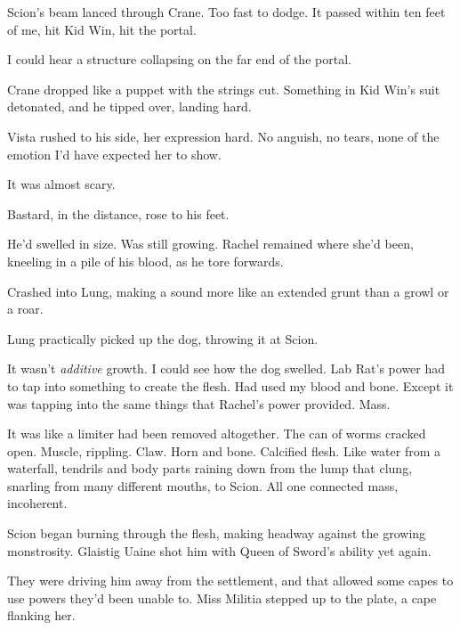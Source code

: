 Scion's beam lanced through Crane.  Too fast to dodge.  It passed within ten feet of me, hit Kid Win, hit the portal.



I could hear a structure collapsing on the far end of the portal.



Crane dropped like a puppet with the strings cut.  Something in Kid Win's suit detonated, and he tipped over, landing hard.



Vista rushed to his side, her expression hard.  No anguish, no tears, none of the emotion I'd have expected her to show.



It was almost scary.



Bastard, in the distance, rose to his feet.



He'd swelled in size.  Was still growing.  Rachel remained where she'd been, kneeling in a pile of his blood, as he tore forwards.



Crashed into Lung, making a sound more like an extended grunt than a growl or a roar.



Lung practically picked up the dog, throwing it at Scion.



It wasn't \emph{additive} growth.  I could see how the dog swelled.  Lab Rat's power had to tap into something to create the flesh.  Had used my blood and bone.  Except it was tapping into the same things that Rachel's power provided.  Mass.



It was like a limiter had been removed altogether.  The can of worms cracked open.  Muscle, rippling.  Claw.  Horn and bone.  Calcified flesh.  Like water from a waterfall, tendrils and body parts raining down from the lump that clung, snarling from many different mouths, to Scion.  All one connected mass, incoherent.



Scion began burning through the flesh, making headway against the growing monstrosity.  Glaistig Uaine shot him with Queen of Sword's ability yet again.



They were driving him away from the settlement, and that allowed some capes to use powers they'd been unable to.  Miss Militia stepped up to the plate, a cape flanking her.



